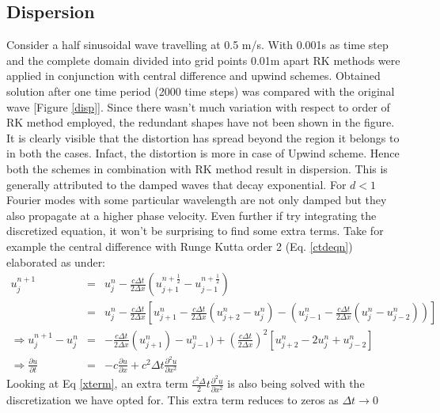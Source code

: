 \documentclass[a4paper,12pt]{report}
\begin{document}
\subsection{Dispersion}
Consider a half sinusoidal wave travelling at 0.5 m/s. With 0.001s as time step and the complete domain divided into grid points 0.01m apart RK methods were applied in conjunction with central difference and upwind schemes. Obtained solution after one time period (2000 time steps) was compared with the original wave [Figure \ref{disp}]. Since there wasn't much variation with respect to order of RK method employed, the redundant shapes have not been shown in the figure. It is clearly visible that the distortion has spread beyond the region it belongs to in both the cases. Infact, the distortion is more in case of Upwind scheme. Hence both the schemes in combination with RK method result in dispersion. This is generally attributed to the damped waves that decay exponential\cite{it1}. For $d<1$ Fourier modes with some particular wavelength	are not only damped but they also propagate at a higher phase velocity. Even further if try integrating the discretized equation, it won't be surprising to find some extra terms. Take for example the central difference with Runge Kutta order 2 (Eq. \ref{ctdeqn}) elaborated as under:
\begin{eqnarray}
u_{j}^{n+1} &=& u_{j}^{n} - \frac{c\Delta t}{2\Delta x}(u_{j+1}^{n+\frac{1}{2}} - u_{j-1}^{n+\frac{1}{2}}) \label{ctdrk2} \\
&=& u_{j}^{n} - \frac{c\Delta t}{2\Delta x}[u_{j+1}^{n}- \frac{c\Delta t}{2\Delta x}(u_{j+2}^{n}-u_{j}^{n}) - (u_{j-1}^{n}-\frac{c\Delta t}{2\Delta x}(u_{j}^{n}-u_{j-2}^{n}))] \nonumber \\
\Rightarrow u_{j}^{n+1}- u_{j}^{n} &=& - \frac{c\Delta t}{2\Delta x}(u_{j+1}^{n})-u_{j-1}^{n}) +(\frac{c\Delta t}{2\Delta x})^2[u_{j+2}^{n}-2u_{j}^{n}+u_{j-2}^{n}] \nonumber \\
\Rightarrow \frac{\partial u}{\partial t} &=& -c\frac{\partial u}{\partial x} + c^2\Delta t\frac{\partial^2 u}{\partial x^2} \label{xterm}
\end{eqnarray}
Looking at Eq \ref{xterm}, an extra term $\frac{c^2\Delta}{2} t\frac{\partial^2 u}{\partial x^2}$ is also being solved with the discretization we have opted for. This extra term reduces to zeros as $\Delta t \rightarrow 0$
\end{document}
